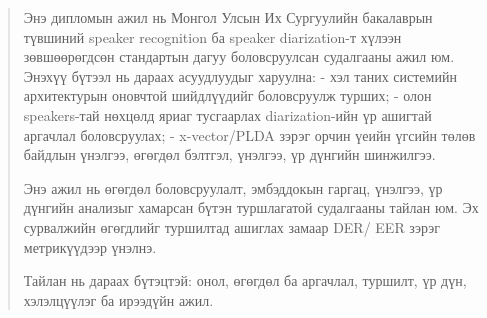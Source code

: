 \begin{abstract}
  Энэ дипломын ажил нь Монгол Улсын Их Сургуулийн бакалаврын түвшиний speaker recognition ба speaker diarization-т
  хүлээн зөвшөөрөгдсөн стандартын дагуу боловсруулсан судалгааны ажил юм. Энэхүү бүтээл нь дараах асуудлуудыг харуулна:
  - хэл таних системийн архитектурын оновчтой шийдлүүдийг боловсруулж турших;
  - олон speakers-тай нөхцөлд яриаг тусгаарлах diarization-ийн үр ашигтай аргачлал боловсруулах;
  - x-vector/PLDA зэрэг орчин үеийн үгсийн төлөв байдлын үнэлгээ, өгөгдөл бэлтгэл, үнэлгээ, үр дүнгийн шинжилгээ.
  
  Энэ ажил нь өгөгдөл боловсруулалт, эмбэддокын гаргац, үнэлгээ, үр дүнгийн анализыг хамарсан бүтэн туршлагатой судалгааны тайлан юм. 
  Эх сурвалжийн өгөгдлийг туршилтад ашиглах замаар DER/ EER зэрэг метрикүүдээр үнэлнэ.
  
  Тайлан нь дараах бүтэцтэй: онол, өгөгдөл ба аргачлал, туршилт, үр дүн, хэлэлцүүлэг ба ирээдүйн ажил.
\end{abstract}

